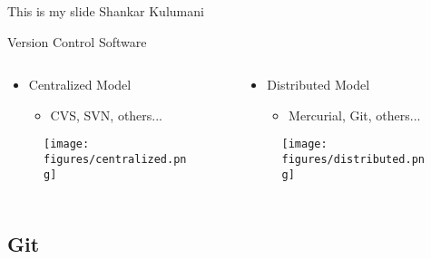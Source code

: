 \documentclass[11pt,professionalfonts]{beamer}
\begin{document}
\begin{frame}{This is my slide}
    Shankar Kulumani
\end{frame}

\begin{frame}{Version Control Software}%
\begin{columns}
\begin{column}[t]{0.5\textwidth}
\begin{itemize}
    \item Centralized Model
    \begin{itemize}
        \item CVS, SVN, others...
    \end{itemize}
\end{itemize}

\begin{figure}
    \centering
    \texttt{[image: figures/centralized.png]}        
\end{figure}
\end{column}

\begin{column}[t]{0.5\textwidth}
\begin{itemize}
    \item Distributed Model
    \begin{itemize}
        \item Mercurial, Git, others...
    \end{itemize}
\end{itemize}
\begin{figure}
    \centering
    \texttt{[image: figures/distributed.png]}
\end{figure}

\end{column}
\end{columns}

\end{frame}%

\section*{}
\subsection*{Git}
\end{document}
